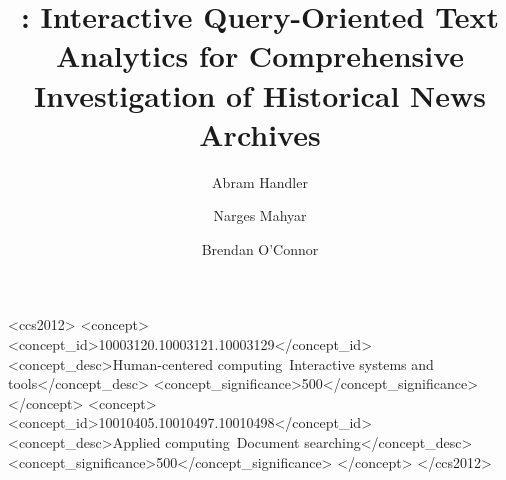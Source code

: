 \documentclass[acmsmall,screen]{acmart}
\begin{document}
\title[\ours]{\ours: Interactive Query-Oriented Text Analytics for Comprehensive Investigation of Historical News Archives}

\author{Abram Handler}

\author{Narges Mahyar}
\author{Brendan O'Connor}


\renewcommand{\shortauthors}{Handler, Mahyar and O'Connor.}



\begin{CCSXML}
<ccs2012>
   <concept>
       <concept_id>10003120.10003121.10003129</concept_id>
       <concept_desc>Human-centered computing~Interactive systems and tools</concept_desc>
       <concept_significance>500</concept_significance>
       </concept>
   <concept>
       <concept_id>10010405.10010497.10010498</concept_id>
       <concept_desc>Applied computing~Document searching</concept_desc>
       <concept_significance>500</concept_significance>
       </concept>
 </ccs2012>
\end{CCSXML}
\end{document}
